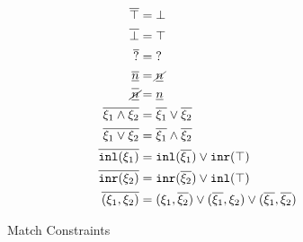 \begin{figure}[ht]
\begin{subequations}\label{defn:dual}
\begin{align}
  \cdual{\ctruth} &= \cfalsity \\
  \cdual{\cfalsity} &= \ctruth \\
  \cdual{\cunknown} &= \cunknown \\
  \cdual{\cnum{n}} &= \cnotnum{n} \\
  \cdual{\cnotnum{n}} &= \cnum{n} \\
  \cdual{\cand{\xi_1}{\xi_2}} &= \cor{\cdual{\xi_1}}{\cdual{\xi_2}} \\
  \cdual{\cor{\xi_1}{\xi_2}} &= \cand{\cdual{\xi_1}}{\cdual{\xi_2}} \\
  \cdual{\cinl{\xi_1}} &= \cor{ \cinl{\cdual{\xi_1}} }{ \cinr{\ctruth} } \\
  \cdual{\cinr{\xi_2}} &= \cor{ \cinr{\cdual{\xi_2}} }{ \cinl{\ctruth} } \\
  \cdual{\cpair{\xi_1}{\xi_2}} &=
  \cor{ \cor{ 
    \cpair{\xi_1}{\cdual{\xi_2}}
  }{
    \cpair{\cdual{\xi_1}}{\xi_2}
  }}{
    \cpair{\cdual{\xi_1}}{\cdual{\xi_2}}
  }
\end{align}
\end{subequations}
  \caption{Match Constraints}
  \label{fig:constraint}
\end{figure}
